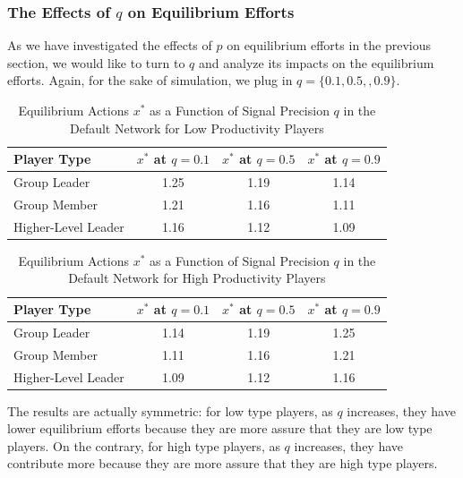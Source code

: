 \documentclass[12pt]{article}
\begin{document}
\subsubsection*{The Effects of $q$ on Equilibrium Efforts}
As we have investigated the effects of $p$ on equilibrium efforts in the previous section, we would like to turn to $q$ and analyze its impacts on the equilibrium efforts. Again, for the sake of simulation, we plug in $q = \{0.1, 0.5, ,0.9\}$.\\
\begin{table}[H]
  \centering
  \caption{Equilibrium Actions \( x^* \) as a Function of Signal Precision \( q \) in the Default Network for Low Productivity Players}
  \begin{tabular}{lccc}
  \toprule
  \textbf{Player Type} & \textbf{\( x^* \) at \( q = 0.1 \)} & \textbf{\( x^* \) at \( q = 0.5 \)} & \textbf{\( x^* \) at \( q = 0.9 \)} \\
  \midrule
  Group Leader       & 1.25 & 1.19 & 1.14 \\
  Group Member       & 1.21 & 1.16 & 1.11 \\
  Higher-Level Leader & 1.16 & 1.12 & 1.09 \\
  \bottomrule
  \end{tabular}
  \end{table}
  \begin{table}[H]
    \centering
    \caption{Equilibrium Actions \( x^* \) as a Function of Signal Precision \( q \) in the Default Network for High Productivity Players}
    \begin{tabular}{lccc}
    \toprule
    \textbf{Player Type} & \textbf{\( x^* \) at \( q = 0.1 \)} & \textbf{\( x^* \) at \( q = 0.5 \)} & \textbf{\( x^* \) at \( q = 0.9 \)} \\
    \midrule
    Group Leader       & 1.14 & 1.19 & 1.25 \\
    Group Member       & 1.11 & 1.16 & 1.21 \\
    Higher-Level Leader & 1.09 & 1.12 & 1.16 \\
    \bottomrule
    \end{tabular}
    \end{table}
 The results are actually symmetric: for low type players, as $q$ increases, they have lower equilibrium efforts because they are more assure that they are low type players. On the contrary, for high type players, as $q$ increases, they have contribute more because they are more assure that they are high type players.\\   
\end{document}
